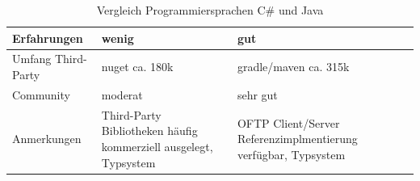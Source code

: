 \begin{table}[H]
\begin{tabular}{|p{3cm}|p{5cm}|p{5cm}|}
    Erfahrungen                    & wenig                                                              & gut                                                            \\ \hline
    Umfang Third-Party             &  nuget ca. 180k \cite{csharp_packages}                           & gradle/maven ca. 315k \cite{java_packages}         \\ \hline
    Community \cite{stackoverflow_survey,tiobe,pypl,github_octoverse,redmonk}                      & moderat                                                            & sehr gut                                                       \\ \hline
    Anmerkungen                    & Third-Party Bibliotheken häufig kommerziell ausgelegt, Typsystem & OFTP Client/Server Referenzimplmentierung verfügbar, Typsystem \\ \hline
    \end{tabular}
    \caption {Vergleich Programmiersprachen C\# und Java}
    \label{tab:comp_pl1}
\end{table}

